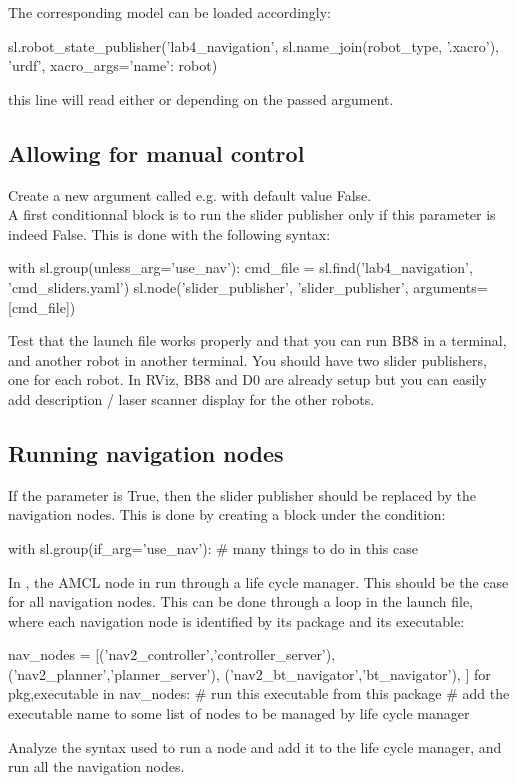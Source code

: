 \documentclass{ecnreport}
\begin{document}
The corresponding model can be loaded accordingly:
\begin{pythoncodelarge}
sl.robot_state_publisher('lab4_navigation', 
                          sl.name_join(robot_type, '.xacro'),
                         'urdf', xacro_args={'name': robot})
\end{pythoncodelarge}this line will read either  or  depending on the passed  argument. 

\subsection{Allowing for manual control}

Create a new argument called e.g.  with default value False. \\

A first conditionnal block is to run the slider publisher only if this parameter is indeed False. This is done with the following syntax:
\begin{pythoncodelarge}
with sl.group(unless_arg='use_nav'):
    cmd_file = sl.find('lab4_navigation', 'cmd_sliders.yaml')
    sl.node('slider_publisher', 'slider_publisher', arguments=[cmd_file])
\end{pythoncodelarge}

Test that the launch file works properly and that you can run BB8 in a terminal, and another robot in another terminal. You should have two slider publishers, one for each robot. In RViz, BB8 and D0 are already setup but you can easily add description / laser scanner display for the other robots.

\subsection{Running navigation nodes}

If the parameter  is True, then the slider publisher should be replaced by the navigation nodes. This is done by creating a block under the condition:
\begin{pythoncodelarge}
with sl.group(if_arg='use_nav'):
    # many things to do in this case
\end{pythoncodelarge}

In , the AMCL node in run through a life cycle manager. This should be the case for all navigation nodes. This can be done through a loop in the launch file, where each navigation node is identified by its package and its executable:
\begin{pythoncodelarge}
nav_nodes = [('nav2_controller','controller_server'), 
        ('nav2_planner','planner_server'),
        ('nav2_bt_navigator','bt_navigator'),
        ]
for pkg,executable in nav_nodes:
    # run this executable from this package
    # add the executable name to some list of nodes to be managed by life cycle manager
\end{pythoncodelarge}Analyze the syntax used to run a node and add it to the life cycle manager, and run all the navigation nodes.\\
\end{document}
